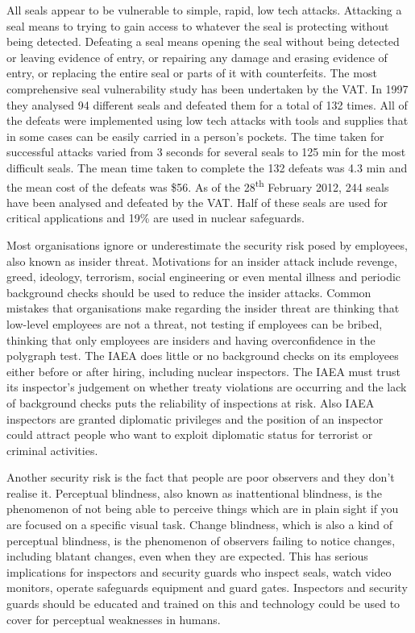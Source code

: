 \documentclass[twoside,titlepage,11pt,twocolumn,a4paper]{article}
\begin{document}
All seals appear to be vulnerable to simple, rapid, low tech
attacks. Attacking a seal means to trying to gain access to whatever
the seal is protecting without being detected. Defeating a seal means
opening the seal without being detected or leaving evidence of entry,
or repairing any damage and erasing evidence of entry, or replacing
the entire seal or parts of it with counterfeits. The most
comprehensive seal vulnerability study has been undertaken by the
VAT. In 1997 they analysed 94 different seals and defeated them for a
total of 132 times. All of the defeats were implemented using low tech
attacks with tools and supplies that in some cases can be easily
carried in a person's pockets. The time taken for successful attacks
varied from 3 seconds for several seals to 125 min for the most
difficult seals. The mean time taken to complete the 132 defeats was
4.3 min and the mean cost of the defeats was
\$56. \citep{vulnSecSeals1997} As of the 28\textsuperscript{th}
February 2012, 244 seals have been analysed and defeated by the
VAT. Half of these seals are used for critical applications and 19\%
are used in nuclear safeguards. \citep{VAT}

Most organisations ignore or underestimate the security risk posed by
employees, also known as insider threat.
\citep{nuclearSafeguardsAndSec2005} Motivations for an insider attack
include revenge, greed, ideology, terrorism, social engineering or
even mental illness and periodic background checks should be used to
reduce the insider attacks. Common mistakes that organisations make
regarding the insider threat are thinking that low-level employees are
not a threat, not testing if employees can be bribed, thinking that
only employees are insiders and having overconfidence in the polygraph
test. \citep{insiderThreat2011} The IAEA does little or no background
checks on its employees either before or after hiring, including
nuclear inspectors. The IAEA must trust its inspector’s judgement on
whether treaty violations are occurring and the lack of background
checks puts the reliability of inspections at risk. Also IAEA
inspectors are granted diplomatic privileges and the position of an
inspector could attract people who want to exploit diplomatic status
for terrorist or criminal
activities. \citep{nuclearSafeguardsAndSec2005}

Another security risk is the fact that people are poor observers and
they don't realise it. Perceptual blindness, also known as
inattentional blindness, is the phenomenon of not being able to
perceive things which are in plain sight if you are focused on a
specific visual task. Change blindness, which is also a kind of
perceptual blindness, is the phenomenon of observers failing to notice
changes, including blatant changes, even when they are expected. This
has serious implications for inspectors and security guards who
inspect seals, watch video monitors, operate safeguards equipment and
guard gates. Inspectors and security guards should be educated and
trained on this and technology could be used to cover for perceptual
weaknesses in humans. \citep{insiderThreat2011}
\end{document}
